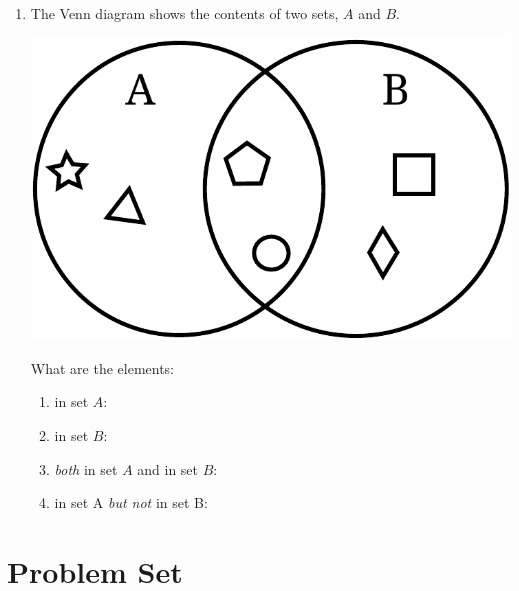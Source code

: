 \documentclass{tufte-book}
\begin{document}
\begin{enumerate}
  \item The Venn diagram shows the contents of two sets, $A$ and $B$.
  \begin{marginfigure}\includegraphics[width=\textwidth]{maths/fig/venn_sets.pdf}\end{marginfigure}
  What are the elements:
  \begin{enumerate}
    \item in set $A$:\dotfill\bigskip
    \item in set $B$:\dotfill\bigskip
    \item \emph{both} in set $A$ and in set $B$:\dotfill\bigskip
    \item in set {A} \emph{but not} in set {B}:\dotfill\bigskip
  \end{enumerate}

\end{enumerate}

\clearpage\section{Problem Set }
\end{document}
